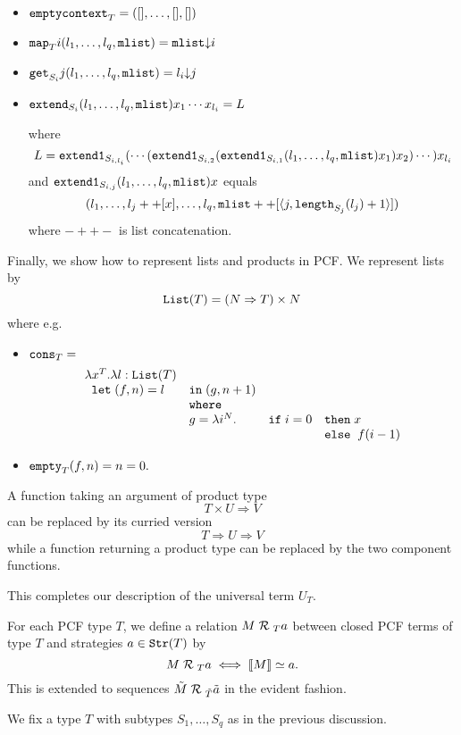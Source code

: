 \documentclass[11pt]{article}
\newcommand{\lang}{\langle}
\newcommand{\rang}{\rangle}
\begin{document}
\begin{itemize}
\item ${\tt emptycontext}_T=([],\dots,[],[])$
\item ${\tt map}_T i(l_1,\dots,l_q,{\tt mlist})={\tt mlist}{\downarrow} i$
\item ${\tt get}_{S_i} j(l_1,\dots,l_q,{\tt mlist})=l_i{\downarrow} j$
\item ${\tt extend}_{S_i}(l_1,\dots,l_q,{\tt mlist})x_1\cdots
  x_{l_i}= L$

where
$$L={\tt extend1}_{S_{i,l_i}}(\cdots({\tt extend1}_{S_{i,2}}({\tt
  extend1}_{S_{i,1}} (l_1,\dots,l_q,{\tt
  mlist})x_1)x_2)\cdots)x_{l_i}$$
and ${\tt extend1}_{S_{i,j}}(l_1,\dots,l_q,{\tt mlist})x$ equals
$$(l_1,\dots,l_j++[x],\dots,l_q,{\tt mlist}++[\lang j,{\tt
  length}_{S_j}(l_j)+1\rang]) $$
where $-++-$ is list concatenation.
\end{itemize}
Finally, we show how to represent lists and products in PCF. We represent
lists by
$${\tt List}(T)=( N\Rightarrow T)\times N$$
where e.g.
\begin{itemize}
\item ${\tt cons}_T=$
\[\begin{array}{llll}
\lambda x^T.  \lambda l:{\tt List}(T) & & & \\
\;\;{\tt let} \;(f,n)=l & {\tt in}\; (g,n+1)  & &\\
& {\tt where} &  & \\
& g=\lambda i^{N}. &{\tt if}\; i=0 &{\tt then}\; x \\
& & & {\tt else} \;\;f(i-1)
\end{array}\]
\item ${\tt empty}_T(f,n)= n=0.$
\end{itemize}
A function taking an argument of product type
$$T\times U\Rightarrow V$$
can be replaced by its curried version
$$T\Rightarrow U\Rightarrow V$$
while a function returning a product type can be replaced by the two
component functions.

This completes our description of the universal term $U_T$.

\newcommand{\R}{{\; \cal R\; }}
For each PCF type $T$, we define a relation $M \R_T a$ between
closed PCF terms of type $T$ and strategies $a\in{\tt Str}(T)$ by
$$M\R_T a\iff \llbracket M\rrbracket \simeq a .$$
This is extended to sequences $\tilde{M}\R_{\tilde{T}}\tilde{a}$ in
the evident fashion.

We fix a type $T$ with subtypes $S_1,\dots, S_q$ as in the previous
discussion.
\end{document}
